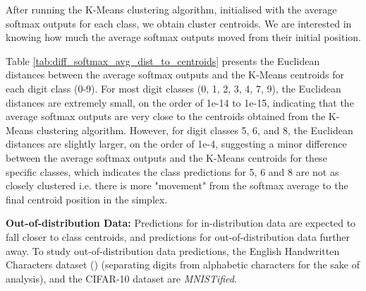 After running the K-Means clustering algorithm, initialised with the  average softmax outputs for each class, we obtain cluster centroids. We are interested in knowing how much the average softmax outputs moved from their initial position. 

Table \ref{tab:diff_softmax_avg_dist_to_centroids} presents the Euclidean distances between the average softmax outputs and the K-Means centroids for each digit class (0-9). For most digit classes (0, 1, 2, 3, 4, 7, 9), the Euclidean distances are extremely small, on the order of 1e-14 to 1e-15, indicating that the average softmax outputs are very close to the centroids obtained from the K-Means clustering algorithm. However, for digit classes 5, 6, and 8, the Euclidean distances are slightly larger, on the order of 1e-4, suggesting a minor difference between the average softmax outputs and the K-Means centroids for these specific classes, which indicates the class predictions for 5, 6 and 8 are not as closely clustered i.e. there is more "movement" from the softmax average to the final centroid position in the simplex.



\textbf{Out-of-distribution Data:} Predictions for in-distribution data are expected to fall closer to class centroids, and predictions for out-of-distribution data further away. To study out-of-distribution data predictions, the English Handwritten Characters dataset (\cite{deCampos09}) (separating digits from alphabetic characters for the sake of analysis), and the CIFAR-10 dataset are \textit{MNISTified}. %

